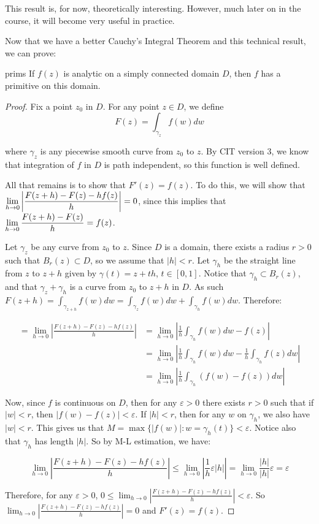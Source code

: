 This result is, for now, theoretically interesting. However, much later on in the course, it will become very useful in practice.

Now that we have a better Cauchy's Integral Theorem and this technical result, we can prove:

\begin{thmbo}{}{prims} If $f(z)$ is analytic on a simply connected domain $D$, then $f$ has a primitive on this domain.
\end{thmbo}

\begin{proof} Fix a point $z_0$ in $D$. For any point $z\in D$, we define
$$F(z) = \int_{\gamma_z}f(w)dw$$

\noin where $\gamma_z$ is any piecewise smooth curve from $z_0$ to $z$. By CIT version 3, we know that integration of $f$ in $D$ is path independent, so this function is well defined.

All that remains is to show that $F'(z) = f(z)$. To do this, we will show that $\displaystyle\lim_{h\rightarrow 0} \left|\frac{F(z+h) - F(z) - hf(z)}{h}\right| = 0$, since this implies that $\displaystyle\lim_{h\rightarrow 0} \frac{F(z+h) - F(z)}{h} = f(z)$. 


Let $\gamma_z$ be any curve from $z_0$ to $z$. Since $D$ is a domain, there exists a radius $r > 0$ such that $B_r(z) \subset D$, so we assume that $|h| < r$. Let $\gamma_h$ be the straight line from $z$ to $z+h$ given by $\gamma(t) = z+th$, $t\in[0,1]$. Notice that $\gamma_h \subset B_r(z)$, and that $\gamma_z+\gamma_h$ is a curve from $z_0$ to $z + h$ in $D$. As such $F(z+h) = \int_{\gamma_{z+h}} f(w)dw = \int_{\gamma_z} f(w)dw + \int_{\gamma_h}f(w)dw$. Therefore:


\begin{align*} =\lim_{h\rightarrow 0} \left|\frac{F(z+h) - F(z) - hf(z)}{h}\right|  &= \lim_{h\rightarrow 0} \left|\frac{1}{h} \int_{\gamma_h} f(w)dw - f(z)\right|\\
&=\lim_{h\rightarrow 0} \left|\frac{1}{h} \int_{\gamma_h} f(w)dw - \frac{1}{h}\int_{\gamma_h}f(z)dw\right|\\
&= \lim_{h\rightarrow 0} \left|\frac{1}{h}\int_{\gamma_h} (f(w) - f(z))dw\right|
\end{align*}

Now, since $f$ is continuous on $D$, then for any $\varepsilon > 0$ there exists $r > 0$ such that if $|w| < r$, then $|f(w) - f(z)|<\varepsilon$. If $|h| < r$, then for any $w$ on $\gamma_h$, we also have $|w| < r$. This gives us that $M = \max\{|f(w)|:w= \gamma_h(t)\} < \varepsilon$. Notice also that $\gamma_h$ has length $|h|$. So by M-L estimation, we have:

$$\lim_{h\rightarrow 0} \left|\frac{F(z+h) - F(z) - hf(z)}{h}\right| \le \lim_{h\rightarrow 0} \left| \frac{1}{h}\varepsilon |h|\right|  = \lim_{h\rightarrow 0} \frac{|h|}{|h|}\varepsilon = \varepsilon$$

Therefore, for any $\varepsilon > 0$, $0\le \lim_{h\rightarrow 0} \left|\frac{F(z+h) - F(z) - hf(z)}{h}\right| < \varepsilon$. So $\lim_{h\rightarrow 0} \left|\frac{F(z+h) - F(z) - hf(z)}{h}\right| = 0$ and $F'(z) = f(z)$.
\end{proof}

